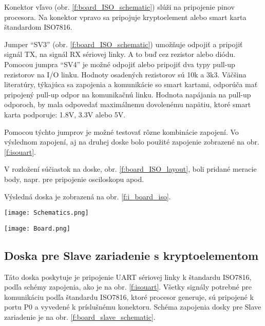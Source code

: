 \documentclass[12pt,a4paper,oneside,openright]{report}
\newcommand{\quotes}[1]{``#1''}
\begin{document}
	Konektor vľavo (obr. \ref{f:board_ISO_schematic}) slúži na pripojenie pinov procesora. Na konektor vpravo sa pripojuje kryptoelement alebo smart karta štandardom ISO7816.
	
	Jumper \quotes{SV3} (obr. \ref{f:board_ISO_schematic}) umožňuje odpojiť a pripojiť signál TX, na signál RX sériovej linky. A to buď cez rezistor alebo diódu.
	Pomocou jumpra \quotes{SV4} je možné odpojiť alebo pripojiť dva typy pull-up rezistorov na I/O linku. Hodnoty osadených rezistorov sú 10k a 3k3. 
	Väčšina literatúry, týkajúca sa zapojenia a komunikácie so smart kartami, odporúča mať pripojený  pull-up odpor na komunikačnú linku. Hodnota napájania na pull-up odporoch, by mala odpovedať maximálnemu dovolenému napätiu, ktoré smart karta podporuje: 1.8V, 3.3V alebo 5V.
	
	Pomocou týchto jumprov je možné testovať rôzne kombinácie zapojení. Vo výslednom zapojení, aj na druhej doske bolo použité zapojenie zobrazené na obr. \ref{f:isouart}.
	
	 V rozložení súčiastok na doske, obr. \ref{f:board_ISO_layout}, boli pridané meracie body, napr. pre pripojenie osciloskopu apod.
	
	Výsledná doska je zobrazená na obr.  \ref{f:i_board_iso}.
	
	\begin{figure*}[!htb]
		\centering
		\texttt{[image: Schematics.png]}
		\caption{Testovacia doska pre konverziu UART na štandard ISO7816.}
		\label{f:board_ISO_schematic}
	\end{figure*}
	
	\begin{figure*}[!htb]
		\centering
		\texttt{[image: Board.png]}
		\caption{Rozloženie súčiastok na doske plošných spojov.}
		\label{f:board_ISO_layout}
	\end{figure*}
	
	\subsection{Doska pre Slave zariadenie s kryptoelementom} \label{slaveboard}

	Táto doska poskytuje je pripojenie UART sériovej linky k štandardu ISO7816, podľa schémy zapojenia, ako je na obr. \ref{f:isouart}. Všetky signály potrebné pre komunikáciu podľa štandardu ISO7816, ktoré procesor generuje, sú pripojené k portu P0 a vyvedené k príslušnému konektoru.
	Schéma zapojenia dosky pre Slave zariadenie je na obr. \ref{f:board_slave_schematic}. 
\end{document}

